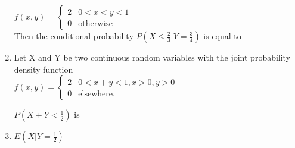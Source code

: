\begin{enumerate}[label=\thesection.\arabic*.,ref=\thesection.\theenumi]
        $
        f(x,y)=
        \begin{cases}
        2 &  0<x<y<1 \\
        0 & \text{otherwise}
        \end{cases}
        $ \\
        Then the conditional probability $P(X \leqslant {\frac{2}{3}}| Y={\frac{3}{4}})$ is equal to
        
        \begin{enumerate}
        \end{enumerate}
        

            
\item             Let X and Y be two continuous random variables with the joint probability density function \\
            $
            f(x,y)= 
            \begin{cases}
            2 & 0<x+y<1, x>0, y>0 \\
            0 & \text{elsewhere}.
            \end{cases}
            $
            
            $P(X+Y<\frac{1}{2})$ is
            
            \begin{enumerate}
            \end{enumerate}
            \solution
            
            
            \item $E(X|Y=\frac{1}{2})$
            

\end{enumerate}
